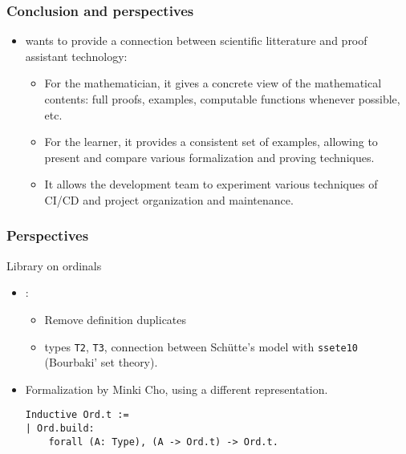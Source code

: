 \documentclass[10pt, fleqn]{beamer}
\begin{document}

\begin{frame}
  \frametitle{Conclusion and perspectives}
  \begin{block}{}
    \begin{itemize}
    \item \Hydras wants to provide  a connection between scientific litterature and proof assistant technology:
      \begin{itemize}
      \item For the mathematician, it gives a concrete view of the mathematical contents: full proofs, examples, computable functions whenever possible, etc.
        \item  For the \coq learner, it provides a consistent set of examples,
          allowing to present and compare various formalization and proving techniques.
          \item It allows the development team to experiment various techniques of CI/CD and project organization and maintenance.
      \end{itemize}
    \end{itemize}
  \end{block}
  \end{frame}


\begin{frame}[fragile]
  \frametitle{Perspectives}
  \begin{block}{Library on ordinals}
      \begin{itemize}
  \item \gaiahydra:
    \begin{itemize}
    \item Remove definition duplicates
     \item types \texttt{T2}, \texttt{T3}, connection between 
    Schütte's model with \texttt{ssete10} (Bourbaki' set theory).
    \end{itemize}
    
  
    \item Formalization by Minki Cho, using a different representation.
{\color{blue}
\begin{verbatim}
Inductive Ord.t :=
| Ord.build: 
    forall (A: Type), (A -> Ord.t) -> Ord.t.
\end{verbatim}
}  
    \end{itemize}

  \end{block}
\end{frame}
\end{document}

